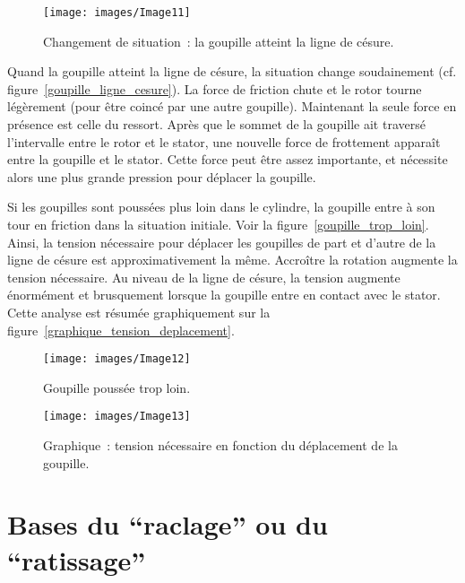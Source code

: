 \documentclass[a4paper,french,11pt,twoside]{report}
\begin{document}
\begin{figure}[ht]
  \begin{center}
    \texttt{[image: images/Image11]}
    \caption{Changement de situation~: la goupille atteint la ligne de césure.\label{goupille_ligne_cesure}}
  \end{center}
\end{figure}

Quand la goupille atteint la ligne de césure, la situation change soudainement (cf. figure~\vref{goupille_ligne_cesure}). La force de friction chute et le rotor tourne légèrement (pour être coincé par une autre goupille). Maintenant la seule force en présence est celle du ressort. Après que le sommet de la goupille ait traversé l'intervalle entre le rotor et le stator, une nouvelle force de frottement apparaît entre la goupille et le stator. Cette force peut être assez importante, et nécessite alors une plus grande pression pour déplacer la goupille.

Si les goupilles sont poussées plus loin dans le cylindre, la goupille entre à son tour en friction dans la situation initiale. Voir la figure~\vref{goupille_trop_loin}. Ainsi, la tension nécessaire pour déplacer les goupilles de part et d'autre de la ligne de césure est approximativement la même. Accroître la rotation augmente la tension nécessaire. Au niveau de la ligne de césure, la tension augmente énormément et brusquement lorsque la goupille entre en contact avec le stator. Cette analyse est résumée graphiquement sur la figure~\vref{graphique_tension_deplacement}.

\begin{figure}[ht]
  \begin{center}
    \texttt{[image: images/Image12]}
    \caption{Goupille poussée trop loin.\label{goupille_trop_loin}}
  \end{center}
\end{figure}

\begin{figure}[ht]
  \begin{center}
    \texttt{[image: images/Image13]}
    \caption{Graphique~: tension nécessaire en fonction du déplacement de la goupille.\label{graphique_tension_deplacement}}
  \end{center}
\end{figure}


\chapter{\label{chap:raclage_ratissage}Bases du \enquote{raclage} ou du \enquote{ratissage}}
\end{document}
